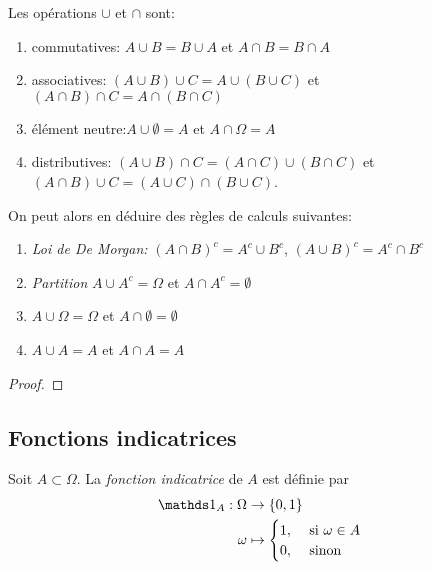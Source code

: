 \begin{proposition}
Les opérations $\cup $ et $\cap $ sont:
	\begin{enumerate}
		\item commutatives: $ A \cup B = B\cup A$ et $ A \cap B = B\cap A$
		\item associatives: $(A \cup B) \cup C = A \cup (B \cup C)$ et $(A \cap B) \cap C = A \cap (B \cap C)$
	 \item élément neutre:$A \cup \emptyset=A$ et $A \cap \Omega=A$
	 \item distributives: $(A \cup B) \cap C = (A \cap C)  \cup (B \cap C)$ et  $(A \cap B) \cup C = (A \cup C)  \cap (B \cup C)$.\pl{\rep{2cm}}
 \end{enumerate}

\end{proposition}

\sld{\vfill\pagebreak[5]\vfill}%


On peut alors en déduire des règles de calculs suivantes:
\begin{proposition}
	\begin{enumerate}
		\item \emph{Loi de De Morgan:} $(A \cap B)^c=A^c \cup B^c$, $(A \cup B)^c=A^c \cap B^c$
		\item \emph{Partition} $A \cup A^c = \Omega$ et  $A \cap A^c = \emptyset$
		\item  $A \cup \Omega = \Omega$ et  $A \cap \emptyset=\emptyset$
		\item  $A \cup A=A$ et  $A \cap A=A$
	\end{enumerate}
\end{proposition}

\begin{proof}
	\pl{\rep{7cm}}
\end{proof}

\subsection{Fonctions indicatrices}


\begin{definition}
	Soit $A\subset \Omega$. La \emph{fonction indicatrice} de $A$ est définie par
	\begin{align*}
		\one_A: \Omega &\to \left\{ 0,1 \right\}\\
			\omega & \mapsto \begin{cases}
				1, & \text{ si } \omega \in A\\
				0, & \text{ sinon }
			\end{cases}
	\end{align*}
\end{definition}

